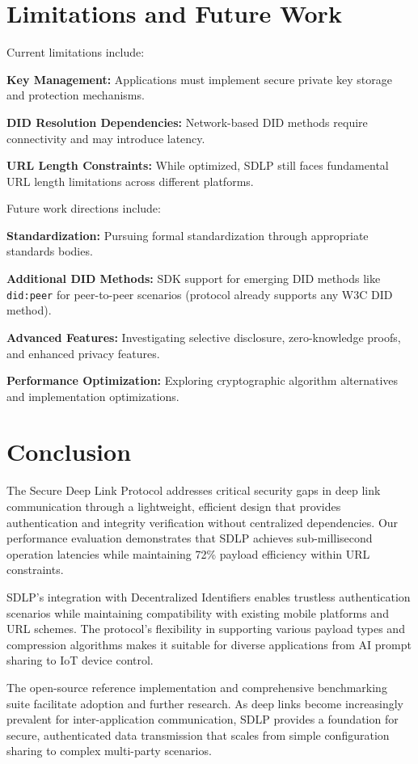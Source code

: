 \documentclass[conference]{IEEEtran}
\begin{document}
\section{Limitations and Future Work}

Current limitations include:

\textbf{Key Management:} Applications must implement secure private key storage and protection mechanisms.

\textbf{DID Resolution Dependencies:} Network-based DID methods require connectivity and may introduce latency.

\textbf{URL Length Constraints:} While optimized, SDLP still faces fundamental URL length limitations across different platforms.

Future work directions include:

\textbf{Standardization:} Pursuing formal standardization through appropriate standards bodies.

\textbf{Additional DID Methods:} SDK support for emerging DID methods like \texttt{did:peer} for peer-to-peer scenarios (protocol already supports any W3C DID method).

\textbf{Advanced Features:} Investigating selective disclosure, zero-knowledge proofs, and enhanced privacy features.

\textbf{Performance Optimization:} Exploring cryptographic algorithm alternatives and implementation optimizations.

\section{Conclusion}

The Secure Deep Link Protocol addresses critical security gaps in deep link communication through a lightweight, efficient design that provides authentication and integrity verification without centralized dependencies. Our performance evaluation demonstrates that SDLP achieves sub-millisecond operation latencies while maintaining 72\% payload efficiency within URL constraints.

SDLP's integration with Decentralized Identifiers enables trustless authentication scenarios while maintaining compatibility with existing mobile platforms and URL schemes. The protocol's flexibility in supporting various payload types and compression algorithms makes it suitable for diverse applications from AI prompt sharing to IoT device control.

The open-source reference implementation and comprehensive benchmarking suite facilitate adoption and further research. As deep links become increasingly prevalent for inter-application communication, SDLP provides a foundation for secure, authenticated data transmission that scales from simple configuration sharing to complex multi-party scenarios.
\end{document}
